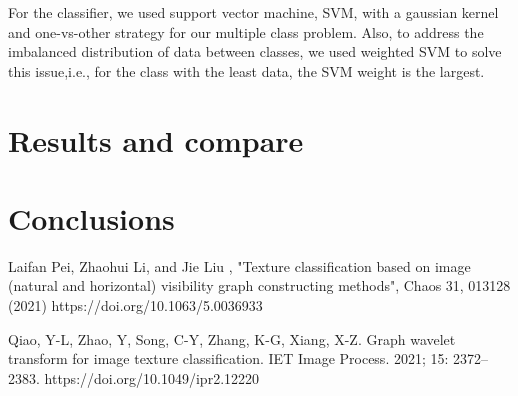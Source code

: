 \documentclass[conference]{IEEEtran}
\begin{document}
For the classifier, we used support vector machine, SVM, with a gaussian kernel and one-vs-other strategy for our multiple class problem. Also, to address the imbalanced distribution of data between classes, we used weighted SVM to solve this issue,i.e., for the class with the least data, the SVM weight is the largest.





\section{Results and compare}
\vspace{1cm}
\section{Conclusions}
\vspace{1cm}








\begin{thebibliography}{00}

Laifan Pei, Zhaohui Li, and Jie Liu , "Texture classification based on image (natural and horizontal) visibility graph constructing methods", Chaos 31, 013128 (2021) https://doi.org/10.1063/5.0036933

Qiao, Y-L, Zhao, Y, Song, C-Y, Zhang, K-G, Xiang, X-Z. Graph wavelet transform for image texture classification. IET Image Process. 2021; 15: 2372– 2383. https://doi.org/10.1049/ipr2.12220



\end{thebibliography}
\vspace{12pt}
\end{document}
